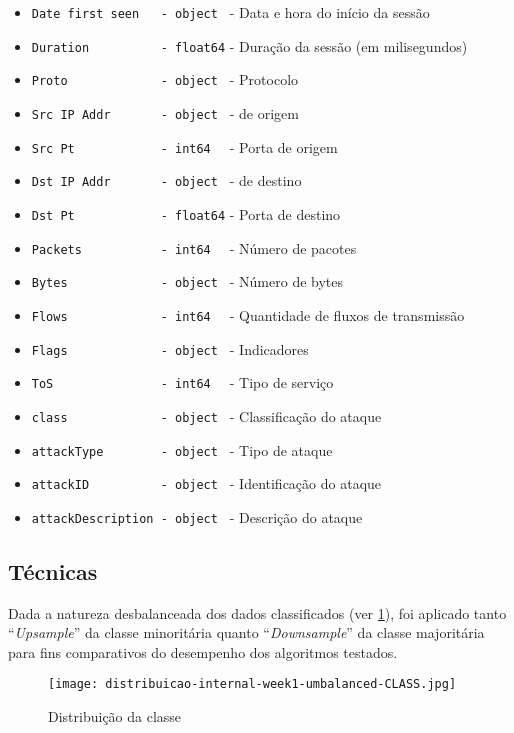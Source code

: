 \documentclass[twoside]{article}
\begin{document}
\begin{itemize}
    \item \texttt{Date first seen~~ - object } - Data e hora do início da sessão
    \item \texttt{Duration~~~~~~~~~ - float64} - Duração da sessão (em milisegundos)
    \item \texttt{Proto~~~~~~~~~~~~ - object } - Protocolo
    \item \texttt{Src IP Addr~~~~~~ - object } -  de origem
    \item \texttt{Src Pt~~~~~~~~~~~ - int64~~} - Porta de origem
    \item \texttt{Dst IP Addr~~~~~~ - object } -  de destino
    \item \texttt{Dst Pt~~~~~~~~~~~ - float64} - Porta de destino
    \item \texttt{Packets~~~~~~~~~~ - int64~~} - Número de pacotes
    \item \texttt{Bytes~~~~~~~~~~~~ - object } - Número de \glspl{byte}
    \item \texttt{Flows~~~~~~~~~~~~ - int64~~} - Quantidade de fluxos de transmissão
    \item \texttt{Flags~~~~~~~~~~~~ - object } - Indicadores 
    \item \texttt{ToS~~~~~~~~~~~~~~ - int64~~} - Tipo de serviço
    \item \texttt{class~~~~~~~~~~~~ - object } - Classificação do ataque
    \item \texttt{attackType~~~~~~~ - object } - Tipo de ataque
    \item \texttt{attackID~~~~~~~~~ - object } - Identificação do ataque
    \item \texttt{attackDescription - object } - Descrição do ataque
\end{itemize}

\subsection{Técnicas}

Dada a natureza desbalanceada dos dados classificados (ver \cref{fig:umbalanced-class}), foi aplicado tanto ``\textit{Upsample}'' da classe minoritária quanto ``\textit{Downsample}'' da classe majoritária para fins comparativos do desempenho dos algoritmos testados.

\begin{figure}
    \centering
    \texttt{[image: distribuicao-internal-week1-umbalanced-CLASS.jpg]}
    \caption{Distribuição da classe}\label{fig:umbalanced-class}
\end{figure}
\end{document}

